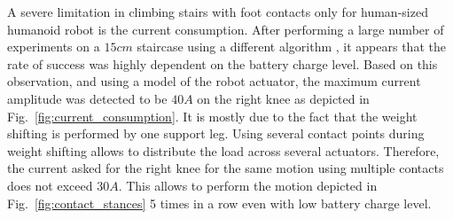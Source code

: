 A severe limitation in climbing stairs with foot contacts only for human-sized humanoid robot is the current consumption.
After performing a large number of experiments on a $15 cm$ staircase using a different algorithm \cite{Morisawa:ICRA:2007}, it appears that the rate of success was highly dependent on the battery charge level.
Based on this observation, and using a model of the robot actuator, the maximum current amplitude was detected to be $40 A$ on the right knee as depicted in Fig.~\ref{fig:current_consumption}.
It is mostly due to the fact that the weight shifting is performed by one support leg.
Using several contact points during weight shifting allows to distribute the load across several actuators.
Therefore, the current asked for the right knee for the same motion using multiple contacts does not exceed $30 A$.
This allows to perform the motion depicted in Fig.~\ref{fig:contact_stances} 5 times in a row even with low battery charge level.

